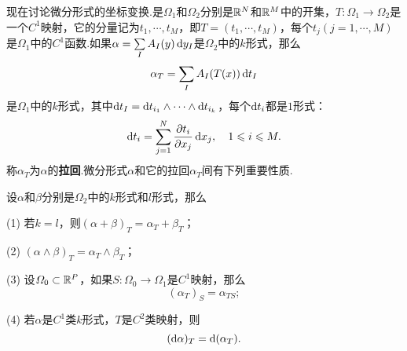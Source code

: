 现在讨论微分形式的坐标变换.是$\Omega_1$和$\Omega_2$分别是$\mathbb R^N$和$\mathbb R^M$中的开集，$T\colon\Omega_1\to\Omega_2$是一个$C^1$映射，它的分量记为$t_1,\cdots,t_M$，即$T=(t_1,\cdots,t_M)$，每个$t_j(j=1,\cdots,M)$是$\Omega_1$中的$C^1$函数.如果$\alpha=\sum\limits_I A_I(y)\mathop{}\!\mathrm dy_I$是$\Omega_2$中的$k$形式，那么
\[\alpha_T=\sum_I A_I(T(x))\mathop{}\!\mathrm{d} t_I\]
是$\Omega_1$中的$k$形式，其中$\mathop{}\!\mathrm{d} t_I=\mathop{}\!\mathrm{d} t_{i_1}\wedge\cdots\wedge\mathop{}\!\mathrm{d} t_{i_k}$，每个$\mathop{}\!\mathrm{d} t_i$都是$1$形式：
\[\mathop{}\!\mathrm{d} t_i=\sum_{j=1}^{N}\frac{\partial t_i}{\partial x_j}\mathop{}\!\mathrm dx_j,\quad 1\leqslant i\leqslant M.\]
称$\alpha_T$为$\alpha$的\textbf{拉回}.微分形式$\alpha$和它的拉回$\alpha_T$间有下列重要性质.
\begin{prop}\label{prop4.5.2}
	设$\alpha$和$\beta$分别是$\Omega_2$中的$k$形式和$l$形式，那么
	
	(1)\hypertarget{4.5.2}{}
	若$k=l$，则$(\alpha+\beta)_T=\alpha_T+\beta_T$；
	
	(2)\hypertarget{4.5.2}{}
	$(\alpha\wedge\beta)_T=\alpha_T\wedge\beta_T$；
	
	(3)\hypertarget{4.5.2}{}
	设$\varOmega_0\subset\mathbb R^P$，如果$S\colon\Omega_0\to\Omega_1$是$C^1$映射，那么
	\[(\alpha_T)_S=\alpha_{TS};\]
	
	(4)\hypertarget{4.5.2}{}
	若$\alpha$是$C^1$类$k$形式，$T$是$C^2$类映射，则
	\[(\mathop{}\!\mathrm{d}\alpha)_T=\mathop{}\!\mathrm{d}(\alpha_T).\]
\end{prop}
